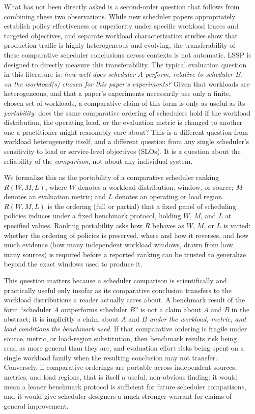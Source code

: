 What has not been directly asked is a second-order question that follows
from combining these two observations. While new scheduler papers
appropriately establish policy effectiveness or superiority under specific
workload traces and targeted objectives, and separate workload characterization
studies show that production traffic is highly heterogeneous and evolving,
the transferability of these comparative scheduler conclusions across contexts is
not automatic. LSSP is designed to directly measure this transferability.
The typical evaluation question in
this literature is: \emph{how well does scheduler $A$ perform, relative to
scheduler $B$, on the workload(s) chosen for this paper's experiments?} Given
that workloads are heterogeneous, and that a paper's experiments necessarily
use only a finite, chosen set of workloads, a comparative claim of this form
is only as useful as its \emph{portability}: does the same comparative
ordering of schedulers hold if the workload distribution, the operating
load, or the evaluation metric is changed to another one a practitioner
might reasonably care about? This is a different question from workload
heterogeneity itself, and a different question from any single scheduler's
sensitivity to load or service-level objectives (SLOs). It is a question about the reliability of the
\emph{comparison}, not about any individual system.

We formalize this as the portability of a comparative scheduler ranking
$R(W, M, L)$, where $W$ denotes a workload distribution, window, or source;
$M$ denotes an evaluation metric; and $L$ denotes an operating or load
region. $R(W, M, L)$ is the ordering (full or partial) that a fixed panel of
scheduling policies induces under a fixed benchmark protocol, holding $W$,
$M$, and $L$ at specified values. Ranking portability asks how $R$ behaves as
$W$, $M$, or $L$ is varied: whether the ordering of policies is preserved,
where and how it reverses, and how much evidence (how many independent
workload windows, drawn from how many sources) is required before a
reported ranking can be trusted to generalize beyond the exact windows used
to produce it.

This question matters because a scheduler comparison is scientifically and
practically useful only insofar as its comparative conclusion transfers to
the workload distributions a reader actually cares about. A benchmark result
of the form ``scheduler $A$ outperforms scheduler $B$'' is not a claim about
$A$ and $B$ in the abstract; it is implicitly a claim about $A$ and $B$
\emph{under the workload, metric, and load conditions the benchmark used}.
If that comparative ordering is fragile under source, metric, or
load-region substitution, then benchmark results risk being read as more
general than they are, and evaluation effort risks being spent on a single
workload family when the resulting conclusion may not transfer. Conversely,
if comparative orderings are portable across independent sources, metrics,
and load regions, that is itself a useful, non-obvious finding: it would
mean a leaner benchmark protocol is sufficient for future scheduler
comparisons, and it would give scheduler designers a much stronger warrant
for claims of general improvement.

